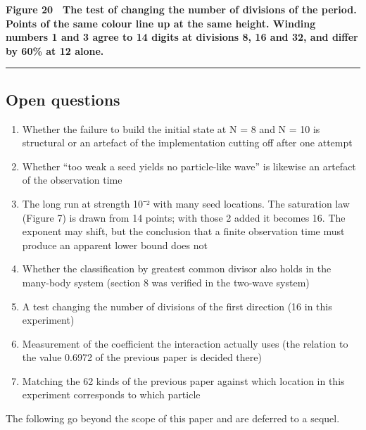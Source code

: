 \documentclass[
]{article}
\providecommand{\tightlist}{%
  \setlength{\itemsep}{0pt}\setlength{\parskip}{0pt}}
\begin{document}
\textbf{Figure 20　The test of changing the number of divisions of the
period. Points of the same colour line up at the same height. Winding
numbers 1 and 3 agree to 14 digits at divisions 8, 16 and 32, and differ
by 60\% at 12 alone.}

\begin{center}\rule{0.5\linewidth}{0.5pt}\end{center}

\subsection{Open questions}\label{open-questions}

\begin{enumerate}
\def\labelenumi{\arabic{enumi}.}
\tightlist
\item
  Whether the failure to build the initial state at N = 8 and N = 10 is
  structural or an artefact of the implementation cutting off after one
  attempt
\item
  Whether ``too weak a seed yields no particle-like wave'' is likewise
  an artefact of the observation time
\item
  The long run at strength 10⁻² with many seed locations. The saturation
  law (Figure 7) is drawn from 14 points; with those 2 added it becomes
  16. The exponent may shift, but the conclusion that a finite
  observation time must produce an apparent lower bound does not
\item
  Whether the classification by greatest common divisor also holds in
  the many-body system (section 8 was verified in the two-wave system)
\item
  A test changing the number of divisions of the first direction (16 in
  this experiment)
\item
  Measurement of the coefficient the interaction actually uses (the
  relation to the value 0.6972 of the previous paper is decided there)
\item
  Matching the 62 kinds of the previous paper against which location in
  this experiment corresponds to which particle
\end{enumerate}

The following go beyond the scope of this paper and are deferred to a
sequel.
\end{document}
